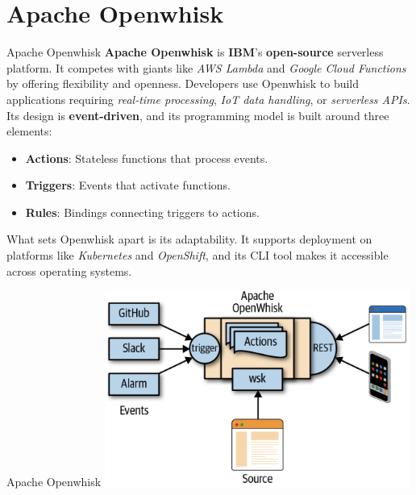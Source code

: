 \documentclass[aspectratio=169]{beamer}
\begin{document}
\section{Apache Openwhisk}
\begin{frame}{Apache Openwhisk}
\textbf{Apache Openwhisk} is \textbf{IBM}’s \textbf{open-source} serverless platform. It competes with giants like \textit{AWS Lambda} and \textit{Google Cloud Functions} by offering flexibility and openness. Developers use Openwhisk to build applications requiring \textit{real-time processing}, \textit{IoT data handling}, or \textit{serverless APIs}.\\
Its design is \textbf{event-driven}, and its programming model is built around three elements:
\begin{itemize}
    \item \textbf{Actions}: Stateless functions that process events.
    \item \textbf{Triggers}: Events that activate functions.
    \item \textbf{Rules}: Bindings connecting triggers to actions.
\end{itemize}
What sets Openwhisk apart is its adaptability. It supports deployment on platforms like \textit{Kubernetes} and \textit{OpenShift}, and its CLI tool makes it accessible across operating systems.
\end{frame}

\begin{frame}{Apache Openwhisk}
\centering
\includegraphics[width=0.75\textwidth]{img/ow_works.png}
\end{frame}
\end{document}

